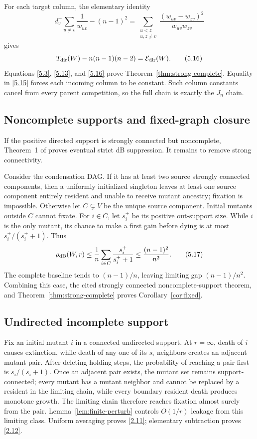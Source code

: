 For each target column, the elementary identity
\[
 d_v^-\sum_{u\ne v}\frac1{w_{uv}}-(n-1)^2
 =\sum_{\substack{u<z\\u,z\ne v}}
   \frac{(w_{uv}-w_{zv})^2}{w_{uv}w_{zv}}                   \tag{5.15}\label{5.15}
\]
gives
\[
 T_{\rm dir}(W)-n(n-1)(n-2)=\mathcal E_{\rm dir}(W).             \tag{5.16}\label{5.16}
\]
Equations \eqref{5.3}, \eqref{5.13}, and \eqref{5.16} prove
Theorem~\ref{thm:strong-complete}.  Equality in \eqref{5.15} forces each
incoming column to be constant.  Such column constants cancel from every
parent competition, so the full chain is exactly the $J_n$ chain.

\subsection{Noncomplete supports and fixed-graph closure}

If the positive directed support is strongly connected but noncomplete,
Theorem~1 of \citet{Tkadlec2020} proves eventual strict dB suppression.  It
remains to remove strong connectivity.

Consider the condensation DAG.  If it has at least two source strongly
connected components, then a uniformly initialized singleton leaves at least
one source component entirely resident and unable to receive mutant ancestry;
fixation is impossible.  Otherwise let $C\subsetneq V$ be the unique source
component.  Initial mutants outside $C$ cannot fixate.  For $i\in C$, let
$s_i^+$ be its positive out-support size.  While $i$ is the only mutant, its
chance to make a first gain before dying is at most $s_i^+/(s_i^++1)$.  Thus
\[
 \rho_{\mathrm{dB}}(W,r)
 \le\frac1n\sum_{i\in C}\frac{s_i^+}{s_i^++1}
 \le\frac{(n-1)^2}{n^2}.                                  \tag{5.17}\label{5.17}
\]
The complete baseline tends to $(n-1)/n$, leaving limiting gap
$(n-1)/n^2$.  Combining this case, the cited strongly connected
noncomplete-support theorem, and Theorem~\ref{thm:strong-complete} proves
Corollary~\ref{cor:fixed}.

\subsection{Undirected incomplete support}

Fix an initial mutant $i$ in a connected undirected support.  At
$r=\infty$, death of $i$ causes extinction, while death of any one of its
$s_i$ neighbors creates an adjacent mutant pair.  After deleting holding
steps, the probability of reaching a pair first is $s_i/(s_i+1)$.  Once an
adjacent pair exists, the mutant set remains support-connected; every mutant
has a mutant neighbor and cannot be replaced by a resident in the limiting
chain, while every boundary resident death produces monotone growth.  The
limiting chain therefore reaches fixation almost surely from the pair.
Lemma~\ref{lem:finite-perturb} controls $O(1/r)$ leakage from this limiting
class.  Uniform averaging proves \eqref{2.11}; elementary subtraction proves
\eqref{2.12}.

